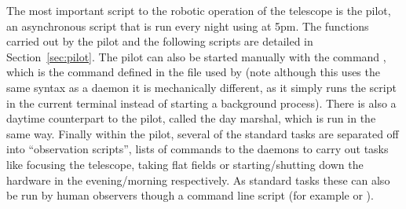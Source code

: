 \begin{colsection}
\begin{colsection}
The most important script to the robotic operation of the telescope is the pilot, an asynchronous script that is run every night using  at 5pm. The functions carried out by the pilot and the following scripts are detailed in Section~\ref{sec:pilot}. The pilot can also be started manually with the command , which is the command defined in the  file used by  (note although this uses the same syntax as a daemon it is mechanically different, as it simply runs the script in the current terminal instead of starting a background process). There is also a daytime counterpart to the pilot, called the day marshal, which is run in the same way. Finally within the pilot, several of the standard tasks are separated off into ``observation scripts'', lists of commands to the daemons to carry out tasks like focusing the telescope, taking flat fields or starting/shutting down the hardware in the evening/morning respectively. As standard tasks these can also be run by human observers though a command line script  (for example  or ).

\end{colsection}


\end{colsection}


